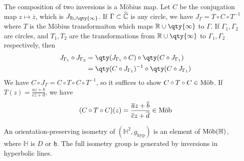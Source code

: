 \begin{remark}
	The composition of two inversions is a M\"obius map.
	Let $C$ be the conjugation map $z \mapsto \overline z$, which is $J_{\mathbb R \cup \qty{\infty}}$.
	If $\Gamma \subset \widehat{\mathbb C}$ is any circle, we have $J_\Gamma = T \circ C \circ T^{-1}$ where $T$ is the M\"obius transformaiton which maps $\mathbb R \cup \qty{\infty}$ to $\Gamma$.
	If $\Gamma_1, \Gamma_2$ are circles, and $T_1, T_2$ are the transformations from $\mathbb R \cup \qty{\infty}$ to $\Gamma_1, \Gamma_2$ respectively, then
	\begin{align*}
		J_{\Gamma_1} \circ J_{\Gamma_2} & = \qty(J_{\Gamma_1} \circ C) \circ \qty(C \circ J_{\Gamma_1})      \\
		                                & = \qty(C \circ J_{\Gamma_1})^{-1} \circ \qty(C \circ J_{\Gamma_1})
	\end{align*}
	We have $C \circ J_\Gamma = C \circ T \circ C \circ T^{-1}$, so it suffices to show $C \circ T \circ C \in \text{M\"ob}$.
	If $T(z) = \frac{az+b}{cz+d}$, we have
	\begin{align*}
		(C \circ T \circ C)(z) = \frac{\overline a z + \overline b}{\overline c z + \overline d} \in \text{M\"ob}
	\end{align*}
\end{remark}
\begin{lemma}
	An orientation-preserving isometry of $(\mathbb H^2, g_{\text{hyp}})$ is an element of $\text{M\"ob}(\mathbb H)$, where $\mathbb H$ is $D$ or $\mathfrak{h}$.
	The full isometry group is generated by inversions in hyperbolic lines.
\end{lemma}
